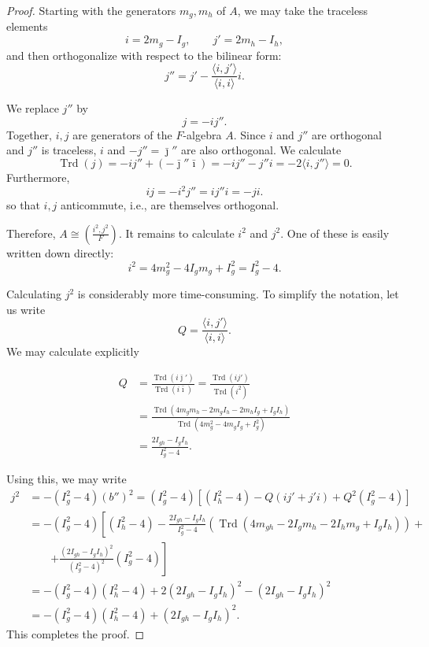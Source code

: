 \documentclass[reqno,oneside,dvipsnames,pdfnames,final]{amsart}
\theoremstyle{definition}
\newcommand{\iso}{\cong}
\newcommand{\Trd}{\operatorname{Trd}}
\begin{document}
\begin{proof}
Starting with the generators $m_g, m_h$ of $A$, we may take the traceless elements
\[ i = 2m_g - I_g,\qquad j'= 2 m_h -  I_h, \]
and then orthogonalize with respect to the bilinear form:
\[ j'' = j' - \frac{ \langle i, j' \rangle}{\langle i, i \rangle} i. \]

\noindent We replace $j''$ by
\[ j = -i j''. \]
Together, $i, j$ are generators of the $F$-algebra $A$. Since $i$ and $j''$ are orthogonal and $j''$ is traceless,  $i$ and $-j'' = \bar \jmath''$ are also orthogonal. We calculate
\[ \Trd(j) = -ij'' + (-\bar \jmath'' \bar \imath) = -ij'' -j''i =  -2 \langle i, j'' \rangle = 0. \]
Furthermore,
\[ ij = -i^2 j'' = ij''i = -ji. \]
so that $i,j$ anticommute, i.e., are themselves orthogonal.

Therefore, $A \iso \left( \frac{ i^2, j^2 }{F} \right)$. It remains to calculate $i^2$ and $j^2$. One of these is easily written down directly:
 \[ i^2 = 4 m_g^2 - 4I_g m_g + I_g^2 = I_g^2 - 4. \]

Calculating $j^2$ is considerably more time-consuming. To simplify the notation, let us write
\[ Q = \frac{ \langle i, j' \rangle}{\langle i, i \rangle}. \] We may calculate explicitly

\begin{equation}
  \begin{aligned}  Q & = \frac{\Trd(i \bar \jmath')}{\Trd(i\bar \imath)} = \frac{\Trd(ij')}{\Trd(i^2)}\\
    &= \frac{\Trd(4m_gm_h -2m_gI_h -2m_hI_g +I_gI_h)}{\Trd(4m_g^2 -4m_gI_g +I^2_g) } \\
    &= \frac{2I_{gh} - I_g I_h}{I_g^2-4}.
  \end{aligned}
  \label{eq:17}
\end{equation}

\noindent Using this, we may write
\begin{align*} j^2 &= -(I_g^2-4)(b'')^2= (I_g^2-4)[(I_h^2 -4) - Q(ij' + j'i) + Q^2 (I_g^2-4)] \\
                   &= -(I_g^2-4)\left[(I_h^2 -4) -
                     \frac{2I_{gh}-I_gI_h}{I_g^2-4}(\Trd(4m_{gh}-2I_gm_h-2I_hm_g+I_gI_h))+ \right. \\
                     & \qquad \left.+\frac{(2I_{gh}-I_gI_h)^2}{(I_g^2-4)^{2}}(I_g^2-4)\right] \\
                   &= -(I_g^2-4)(I_h^2-4) +2(2I_{gh}-I_gI_h)^2-(2I_{gh}-I_gI_h)^2 \\
                   &=-(I_g^2-4)(I_h^2-4)  + (2I_{gh}-I_gI_h)^2.
\end{align*}
This completes the proof.
\end{proof}
\end{document}
